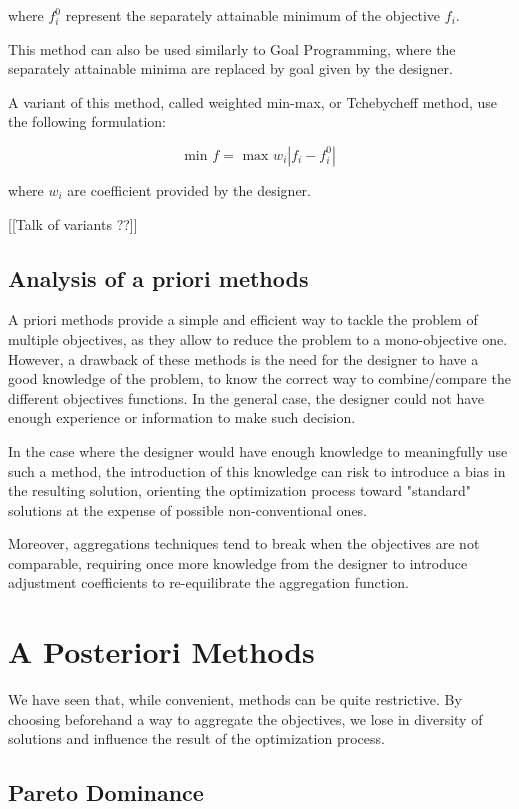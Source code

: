where $f_i^0$ represent the separately attainable minimum of the objective $f_i$.

This method can also be used similarly to Goal Programming, where the separately attainable minima are replaced by goal given by the designer.

A variant of this method, called weighted min-max, or Tchebycheff method, use the following formulation:

\[ \text{min } f = \text{ max } w_i |f_i - f_i^0| \]

where $w_i$ are coefficient provided by the designer.

[[Talk of variants ??]]

\subsection{Analysis of a priori methods}

A priori methods provide a simple and efficient way to tackle the problem of multiple objectives, as they allow to reduce the problem to a mono-objective one.
However, a drawback of these methods is the need for the designer to have a good knowledge of the problem, to know the correct way to combine/compare the different objectives functions. In the general case, the designer could not have enough experience or information to make such decision.

In the case where the designer would have enough knowledge to meaningfully use such a method, the introduction of this knowledge can risk to introduce a bias in the resulting solution, orienting the optimization process toward "standard" solutions at the expense of possible non-conventional ones.

Moreover, aggregations techniques tend to break when the objectives are not comparable, requiring once more knowledge from the designer to introduce adjustment coefficients to re-equilibrate the aggregation function.

\section{A Posteriori Methods}

We have seen that, while convenient,  methods can be quite restrictive. By choosing beforehand a way to aggregate the objectives, we lose in diversity of solutions and influence the result of the optimization process.

\subsection{Pareto Dominance}


